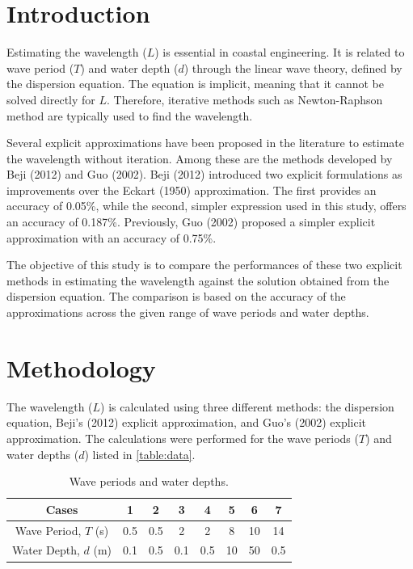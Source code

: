\documentclass[a4paper, 11pt]{article}
\begin{document}
\listoffigures
\listoftables
\newpage

\section{Introduction}

\hspace*{0.5cm}Estimating the wavelength ($L$) is  essential in coastal engineering. It is related to wave period ($T$) and water depth ($d$) through the linear wave theory, defined by the dispersion equation. The equation is implicit, meaning that it cannot be solved directly for $L$. Therefore, iterative methods such as Newton-Raphson method are typically used to find the wavelength. 

Several explicit approximations have been proposed in the literature to estimate the wavelength without iteration. Among these are the methods developed by Beji (2012) and Guo (2002). Beji (2012) introduced two explicit formulations as improvements over the Eckart (1950) approximation. The first provides an accuracy of 0.05\%, while the second, simpler expression used in this study, offers an accuracy of 0.187\%. Previously, Guo (2002) proposed a simpler explicit approximation with an accuracy of 0.75\%. 

The objective of this study is to compare the performances of these two explicit methods in estimating the wavelength against the solution obtained from the dispersion equation. The comparison is based on the accuracy of the approximations across the given range of wave periods and water depths.

\section{Methodology}

\hspace*{0.5cm}The wavelength ($L$) is calculated using three different methods: the dispersion equation, Beji's (2012) explicit approximation, and Guo's (2002) explicit approximation. The calculations were performed for the wave periods ($T$) and water depths ($d$) listed in \autoref{table:data}. 

\begin{table}[H]
    \centering
    \caption{Wave periods and water depths.}
    \begin{tabular}{|c|c|c|c|c|c|c|c|}
        \hline
        Cases & 1 & 2 & 3 & 4 & 5 & 6 & 7 \\
        \hline
        Wave Period, $T$ (s) & 0.5 & 0.5 & 2 & 2 & 8 & 10 & 14 \\
        \hline
        Water Depth, $d$ (m) & 0.1 & 0.5 & 0.1 & 0.5 & 10 & 50 & 0.5 \\
        \hline
    \end{tabular}
    \label{table:data}
\end{table}
\end{document}
